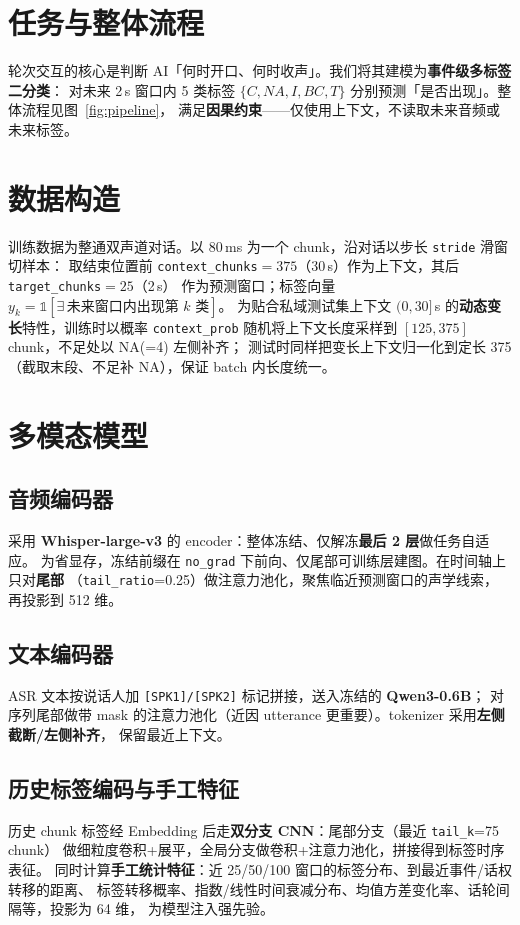 \documentclass[10pt,twocolumn,a4paper]{ctexart}
\begin{document}
\section{任务与整体流程}
轮次交互的核心是判断 AI「何时开口、何时收声」。我们将其建模为\textbf{事件级多标签二分类}：
对未来 2\,s 窗口内 5 类标签 $\{C,NA,I,BC,T\}$ 分别预测「是否出现」。整体流程见图~\ref{fig:pipeline}，
满足\textbf{因果约束}——仅使用上下文，不读取未来音频或未来标签。

\section{数据构造}
训练数据为整通双声道对话。以 80\,ms 为一个 chunk，沿对话以步长 \texttt{stride} 滑窗切样本：
取结束位置前 \texttt{context\_chunks}$=375$（30\,s）作为上下文，其后 \texttt{target\_chunks}$=25$（2\,s）
作为预测窗口；标签向量 $y_k=\mathbb{1}[\exists\, \text{未来窗口内出现第 }k\text{ 类}]$。
为贴合私域测试集上下文 $(0,30]$\,s 的\textbf{动态变长}特性，训练时以概率
\texttt{context\_prob} 随机将上下文长度采样到 $[125,375]$ chunk，不足处以 NA(=4) 左侧补齐；
测试时同样把变长上下文归一化到定长 375（截取末段、不足补 NA），保证 batch 内长度统一。

\section{多模态模型}
\subsection{音频编码器}
采用 \textbf{Whisper-large-v3} 的 encoder：整体冻结、仅解冻\textbf{最后 2 层}做任务自适应。
为省显存，冻结前缀在 \texttt{no\_grad} 下前向、仅尾部可训练层建图。在时间轴上只对\textbf{尾部}
（\texttt{tail\_ratio}=0.25）做注意力池化，聚焦临近预测窗口的声学线索，再投影到 512 维。

\subsection{文本编码器}
ASR 文本按说话人加 \texttt{[SPK1]/[SPK2]} 标记拼接，送入冻结的 \textbf{Qwen3-0.6B}；
对序列尾部做带 mask 的注意力池化（近因 utterance 更重要）。tokenizer 采用\textbf{左侧截断/左侧补齐}，
保留最近上下文。

\subsection{历史标签编码与手工特征}
历史 chunk 标签经 Embedding 后走\textbf{双分支 CNN}：尾部分支（最近 \texttt{tail\_k}=75 chunk）
做细粒度卷积+展平，全局分支做卷积+注意力池化，拼接得到标签时序表征。
同时计算\textbf{手工统计特征}：近 25/50/100 窗口的标签分布、到最近事件/话权转移的距离、
标签转移概率、指数/线性时间衰减分布、均值方差变化率、话轮间隔等，投影为 64 维，
为模型注入强先验。
\end{document}
